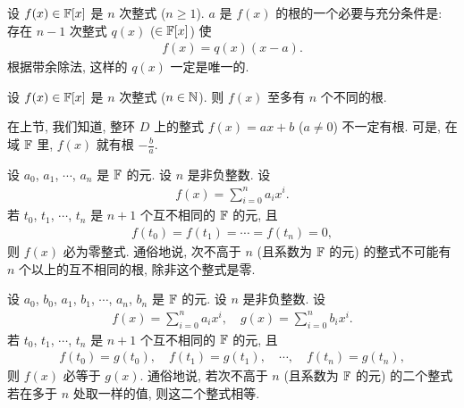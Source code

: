 \begin{proposition}
    设 $f(x) \in \mathbb{F}[x]$ 是 $n$ 次整式 ($n \geq 1$). $a$ 是 $f(x)$ 的根的一个必要与充分条件是: 存在 $n-1$ 次整式 $q(x)$ ($\in \mathbb{F}[x]$) 使
    \begin{align*}
        f(x) = q(x) (x-a).
    \end{align*}
    根据带余除法, 这样的 $q(x)$ 一定是唯一的.
\end{proposition}

\begin{proposition}
    设 $f(x) \in \mathbb{F}[x]$ 是 $n$ 次整式 ($n \in \mathbb{N}$). 则 $f(x)$ 至多有 $n$ 个不同的根.
\end{proposition}

\begin{remark}
    在上节, 我们知道, 整环 $D$ 上的整式 $f(x) = ax + b$ ($a \neq 0$) 不一定有根. 可是, 在域 $\mathbb{F}$ 里, $f(x)$ 就有根 $-\frac{b}{a}$.
\end{remark}

\begin{proposition}
    设 $a_0$, $a_1$, $\cdots$, $a_n$ 是 $\mathbb{F}$ 的元. 设 $n$ 是非负整数. 设
    \begin{align*}
        f(x) = \sum_{i = 0}^n a_i x^i.
    \end{align*}
    若 $t_0$, $t_1$, $\cdots$, $t_n$ 是 $n+1$ 个互不相同的 $\mathbb{F}$ 的元, 且
    \begin{align*}
        f(t_0) = f(t_1) = \cdots = f(t_n) = 0,
    \end{align*}
    则 $f(x)$ 必为零整式. 通俗地说, 次不高于 $n$ (且系数为 $\mathbb{F}$ 的元) 的整式不可能有 $n$ 个以上的互不相同的根, 除非这个整式是零.
\end{proposition}

\begin{proposition}
    设 $a_0$, $b_0$, $a_1$, $b_1$, $\cdots$, $a_n$, $b_n$ 是 $\mathbb{F}$ 的元. 设 $n$ 是非负整数. 设
    \begin{align*}
        f(x) = \sum_{i = 0}^n a_i x^i, \quad g(x) = \sum_{i = 0}^n b_i x^i.
    \end{align*}
    若 $t_0$, $t_1$, $\cdots$, $t_n$ 是 $n+1$ 个互不相同的 $\mathbb{F}$ 的元, 且
    \begin{align*}
        f(t_0) = g(t_0), \quad f(t_1) = g(t_1), \quad \cdots, \quad f(t_n) = g(t_n),
    \end{align*}
    则 $f(x)$ 必等于 $g(x)$. 通俗地说, 若次不高于 $n$ (且系数为 $\mathbb{F}$ 的元) 的二个整式若在多于 $n$ 处取一样的值, 则这二个整式相等.
\end{proposition}

